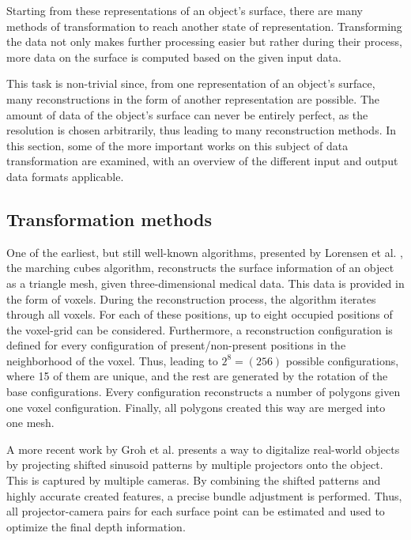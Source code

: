   Starting from these representations of an object's surface, there are many methods 
  of transformation to reach another state of representation. 
  Transforming the data not only makes further processing easier
  but rather during their process, more data on the surface is 
  computed based on the given input data.

  This task is non-trivial since, from one representation of an object's
  surface, many reconstructions in the form of another representation 
  are possible. The amount of data of the object's surface can never
  be entirely perfect, as the resolution is chosen arbitrarily, thus leading to many reconstruction methods.
  In this section, some of the more important works on this subject of data transformation are examined, with 
  an overview of the different input and output data formats applicable. 

 \subsection{Transformation methods}

  One of the earliest, but still well-known algorithms, presented by
  Lorensen et al. \cite{Lorensen:1987:MCH:37402.37422}, the marching cubes algorithm, reconstructs the surface information of an object as a
  triangle mesh, given three-dimensional medical data. This data is provided in the form of
  voxels. 
  During the reconstruction process, the algorithm iterates through all voxels. For each of these positions, up to eight occupied positions of the voxel-grid can be considered. Furthermore, a reconstruction configuration is defined for every configuration of present/non-present positions in the neighborhood of the voxel. Thus, leading to $2^8 = (256)$ possible configurations, where 15 of them are unique, and the rest are generated by the rotation of the base configurations.  Every configuration reconstructs a number of polygons given one voxel configuration. Finally, all polygons created this way are merged into one mesh.

  A more recent work by Groh et al.\cite{Groh2017} presents a way to digitalize real-world objects by projecting shifted sinusoid patterns by multiple projectors onto the object. This is captured by multiple cameras. By combining the shifted patterns and highly accurate created features, a precise bundle adjustment is performed. Thus, all projector-camera pairs for each surface point can be estimated and used to optimize the final depth information.


